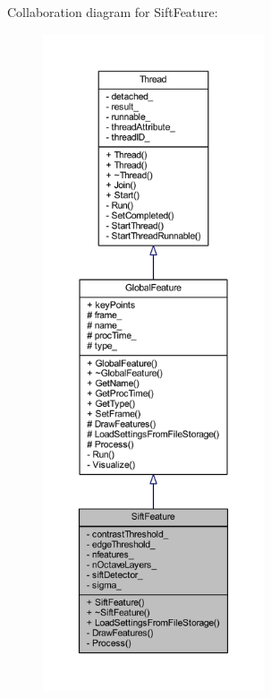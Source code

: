 Collaboration diagram for Sift\-Feature\-:
\nopagebreak
\begin{figure}[H]
\begin{center}
\leavevmode
\includegraphics[height=550pt]{class_sift_feature__coll__graph}
\end{center}
\end{figure}
